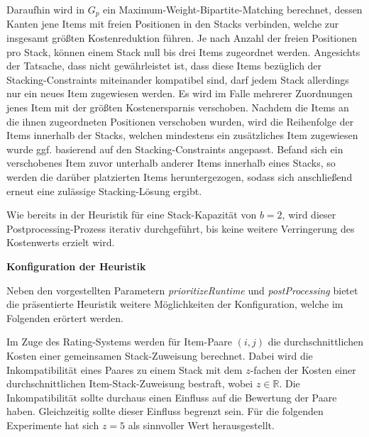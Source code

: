 Daraufhin wird in $G_p$ ein Maximum-Weight-Bipartite-Matching berechnet, dessen Kanten jene Items
mit freien Positionen in den Stacks verbinden, welche zur insgesamt größten Kostenreduktion führen.
Je nach Anzahl der freien Positionen pro Stack, können einem Stack null bis drei Items zugeordnet werden.
Angesichts der Tatsache, dass nicht gewährleistet ist, dass diese Items bezüglich der Stacking-Constraints miteinander kompatibel sind, darf jedem Stack allerdings nur ein neues Item zugewiesen werden.
Es wird im Falle mehrerer Zuordnungen jenes Item mit der größten Kostenersparnis verschoben.
Nachdem die Items an die ihnen zugeordneten Positionen verschoben wurden, wird die Reihenfolge der Items
innerhalb der Stacks, welchen mindestens ein zusätzliches Item zugewiesen wurde ggf. basierend auf den Stacking-Constraints angepasst. Befand sich ein verschobenes Item zuvor unterhalb anderer Items innerhalb eines Stacks, so werden die darüber platzierten Items heruntergezogen, sodass sich anschließend erneut eine zulässige Stacking-Lösung ergibt.

Wie bereits in der Heuristik für eine Stack-Kapazität von $b = 2$, wird dieser Postprocessing-Prozess
iterativ durchgeführt, bis keine weitere Verringerung des Kostenwerts erzielt wird.

\textbf{Konfiguration der Heuristik}

Neben den vorgestellten Parametern \textit{prioritizeRuntime} und \textit{postProcessing} bietet
die präsentierte Heuristik weitere Möglichkeiten der Konfiguration, welche im Folgenden erörtert werden.

Im Zuge des Rating-Systems werden für Item-Paare $(i, j)$ die durchschnittlichen Kosten einer gemeinsamen
Stack-Zuweisung berechnet. Dabei wird die Inkompatibilität eines Paares zu einem Stack mit dem $z$-fachen
der Kosten einer durchschnittlichen Item-Stack-Zuweisung bestraft, wobei $z \in \mathbb{R}$.
Die Inkompatibilität sollte durchaus einen Einfluss auf die Bewertung der Paare haben.
Gleichzeitig sollte dieser Einfluss begrenzt sein. Für die folgenden Experimente hat sich $z = 5$ als sinnvoller Wert herausgestellt.

